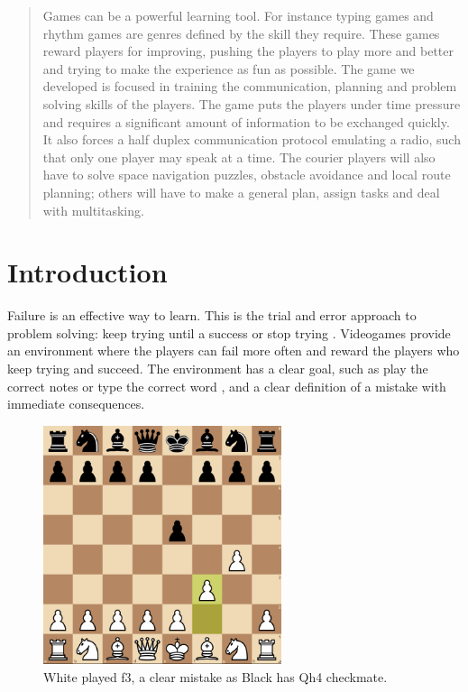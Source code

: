 \documentclass[12pt]{article}
\newcommand\blankpage{%
    \null
    \thispagestyle{empty}%
    \addtocounter{page}{-1}%
    \newpage}
\begin{document}
\clearpage

\afterpage{\blankpage}

\begin{abstract}
Games can be a powerful learning tool. For instance typing games and rhythm games are genres defined by the skill they require. These games reward players for improving, pushing the players to play more and better and trying to make the experience as fun as possible. The game we developed is focused in training the communication, planning and problem solving skills of the players. The game puts the players under time pressure and requires a significant amount of information to be exchanged quickly. It also forces a half duplex communication protocol emulating a radio, such that only one player may speak at a time. The courier players will also have to solve space navigation puzzles, obstacle avoidance and local route planning; others will have to make a general plan, assign tasks and deal with multitasking. 
\end{abstract}

\clearpage

\tableofcontents

\clearpage

\section{Introduction}
Failure is an effective way to learn. This is the trial and error approach to problem solving: keep trying until a success or stop trying \cite{try}. Videogames provide an environment where the players can fail more often and reward the players who keep trying and succeed. The environment has a clear goal, such as play the correct notes \cite{rhythm} or type the correct word \cite{typing}, and a clear definition of a mistake with immediate consequences. 

\begin{figure}[H]
\begin{center}
\includegraphics[height=7cm]{chess}
\end{center}
\caption{White played f3, a clear mistake as Black has Qh4 checkmate.}
\end{figure}
\end{document}
